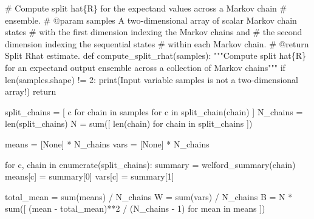 \documentclass[
  letterpaper,
  DIV=11,
  numbers=noendperiod]{scrartcl}
\newenvironment{Shaded}{\begin{snugshade}}{\end{snugshade}}
\newcommand{\BuiltInTok}[1]{\textcolor[rgb]{0.00,0.23,0.31}{#1}}
\newcommand{\CommentTok}[1]{\textcolor[rgb]{0.37,0.37,0.37}{#1}}
\newcommand{\ControlFlowTok}[1]{\textcolor[rgb]{0.00,0.23,0.31}{#1}}
\newcommand{\DecValTok}[1]{\textcolor[rgb]{0.68,0.00,0.00}{#1}}
\newcommand{\KeywordTok}[1]{\textcolor[rgb]{0.00,0.23,0.31}{#1}}
\newcommand{\NormalTok}[1]{\textcolor[rgb]{0.00,0.23,0.31}{#1}}
\newcommand{\OperatorTok}[1]{\textcolor[rgb]{0.37,0.37,0.37}{#1}}
\newcommand{\StringTok}[1]{\textcolor[rgb]{0.13,0.47,0.30}{#1}}
\newcommand{\VariableTok}[1]{\textcolor[rgb]{0.07,0.07,0.07}{#1}}
\begin{document}
\begin{Shaded}
\begin{Highlighting}[]
\CommentTok{\# Compute split hat\{R\} for the expectand values across a Markov chain}
\CommentTok{\# ensemble.}
\CommentTok{\# @param samples A two{-}dimensional array of scalar Markov chain states}
\CommentTok{\#                with the first dimension indexing the Markov chains and}
\CommentTok{\#                the second dimension indexing the sequential states}
\CommentTok{\#                within each Markov chain.}
\CommentTok{\# @return Split Rhat estimate.}
\KeywordTok{def}\NormalTok{ compute\_split\_rhat(samples):}
  \CommentTok{"""Compute split hat\{R\} for an expectand output ensemble across}
\CommentTok{     a collection of Markov chains"""}
  \ControlFlowTok{if} \BuiltInTok{len}\NormalTok{(samples.shape) }\OperatorTok{!=} \DecValTok{2}\NormalTok{:}
    \BuiltInTok{print}\NormalTok{(}\StringTok{\textquotesingle{}Input variable \textasciigrave{}samples\textasciigrave{} is not a two{-}dimensional array!\textquotesingle{}}\NormalTok{)}
    \ControlFlowTok{return}
  
\NormalTok{  split\_chains }\OperatorTok{=}\NormalTok{ [ c }\ControlFlowTok{for}\NormalTok{ chain }\KeywordTok{in}\NormalTok{ samples }\ControlFlowTok{for}\NormalTok{ c }\KeywordTok{in}\NormalTok{ split\_chain(chain) ]}
\NormalTok{  N\_chains }\OperatorTok{=} \BuiltInTok{len}\NormalTok{(split\_chains)}
\NormalTok{  N }\OperatorTok{=} \BuiltInTok{sum}\NormalTok{([ }\BuiltInTok{len}\NormalTok{(chain) }\ControlFlowTok{for}\NormalTok{ chain }\KeywordTok{in}\NormalTok{ split\_chains ])}
  
\NormalTok{  means }\OperatorTok{=}\NormalTok{ [}\VariableTok{None}\NormalTok{] }\OperatorTok{*}\NormalTok{ N\_chains}
  \BuiltInTok{vars} \OperatorTok{=}\NormalTok{ [}\VariableTok{None}\NormalTok{] }\OperatorTok{*}\NormalTok{ N\_chains}
  
  \ControlFlowTok{for}\NormalTok{ c, chain }\KeywordTok{in} \BuiltInTok{enumerate}\NormalTok{(split\_chains):}
\NormalTok{    summary }\OperatorTok{=}\NormalTok{ welford\_summary(chain)}
\NormalTok{    means[c] }\OperatorTok{=}\NormalTok{ summary[}\DecValTok{0}\NormalTok{]}
    \BuiltInTok{vars}\NormalTok{[c] }\OperatorTok{=}\NormalTok{ summary[}\DecValTok{1}\NormalTok{]}
  
\NormalTok{  total\_mean }\OperatorTok{=} \BuiltInTok{sum}\NormalTok{(means) }\OperatorTok{/}\NormalTok{ N\_chains}
\NormalTok{  W }\OperatorTok{=} \BuiltInTok{sum}\NormalTok{(}\BuiltInTok{vars}\NormalTok{) }\OperatorTok{/}\NormalTok{ N\_chains}
\NormalTok{  B }\OperatorTok{=}\NormalTok{ N }\OperatorTok{*} \BuiltInTok{sum}\NormalTok{([ (mean }\OperatorTok{{-}}\NormalTok{ total\_mean)}\OperatorTok{**}\DecValTok{2} \OperatorTok{/}\NormalTok{ (N\_chains }\OperatorTok{{-}} \DecValTok{1}\NormalTok{) }
                \ControlFlowTok{for}\NormalTok{ mean }\KeywordTok{in}\NormalTok{ means ])}
  

\end{Highlighting}
\end{Shaded}
\end{document}
